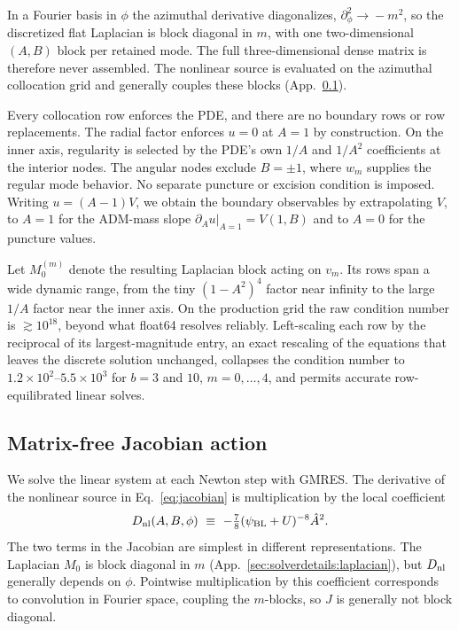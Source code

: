 \documentclass[
  aps,
  prd,
  twocolumn,
  10pt,
  amsmath,
  amssymb,
  nofootinbib,
  superscriptaddress,
  floatfix,
]{revtex4-2}
\newcommand{\psiBL}{\psi_{\mathrm{BL}}}
\newcommand{\Ahat}{\hat{A}}
\begin{document}
In a Fourier basis in $\phi$ the azimuthal derivative dia\-gonalizes, $\partial_\phi^2\!\rightarrow\!-m^2$, so the discretized flat Laplacian is block diagonal in $m$, with one two-dimensional $(A,B)$ block per retained mode.
The full three-dimensional dense matrix is therefore never assembled.
The nonlinear source is evaluated on the azimuthal collocation grid and generally couples these blocks (App.~\ref{sec:solverdetails:action}).

Every collocation row enforces the PDE, and there are no boundary rows or row replacements.
The radial factor enforces $u=0$ at $A=1$ by construction.
On the inner axis, regularity is selected by the PDE's own $1/A$ and $1/A^2$ coefficients at the interior nodes.
The angular nodes exclude $B=\pm1$, where $w_m$ supplies the regular mode behavior.
No separate puncture or excision condition is imposed.
Writing $u=(A-1)V$, we obtain the boundary observables by extrapolating $V$, to $A=1$ for the ADM-mass slope $\partial_A u|_{A=1}=V(1,B)$ and to $A=0$ for the puncture values.

Let $M_0^{(m)}$ denote the resulting Laplacian block acting on $v_m$.
Its rows span a wide dynamic range, from the tiny $(1-A^2)^4$ factor near infinity to the large $1/A$ factor
near the inner axis.
On the production grid the raw condition number is $\gtrsim10^{18}$, beyond what float64 resolves reliably.
Left-scaling each row by the reciprocal of its largest-magnitude entry, an exact
rescaling of the equations that leaves the discrete solution unchanged, collapses the
condition number to $1.2\times10^2$--$5.5\times10^3$ for $b=3$ and $10$, $m=0,\ldots,4$, and permits accurate row-equilibrated linear solves.

\subsection{Matrix-free Jacobian action}
\label{sec:solverdetails:action}

We solve the linear system at each Newton step with GMRES. The derivative of the nonlinear source in
Eq.~\eqref{eq:jacobian} is multiplication by the local coefficient
\begin{equation}
D_{\rm nl}(A,B,\phi)
\ \equiv \
-\tfrac78(\psiBL+U)^{-8}\Ahat^2.
\end{equation}
The two terms in the Jacobian are simplest in different representations.
The Laplacian $M_0$ is block diagonal in $m$ (App.~\ref{sec:solverdetails:laplacian}), but $D_{\rm nl}$ generally depends on $\phi$.
Pointwise multiplication by this coefficient corresponds to convolution in
Fourier space, coupling the $m$-blocks, so $J$ is generally not block diagonal.
\end{document}
